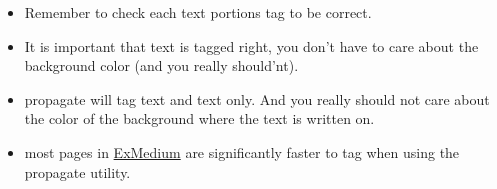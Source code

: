 \documentclass[12pt]{article}
\begin{document}
\begin{itemize}
\item Remember to check each text portions tag to be correct. \\
\item It is important that text is tagged right, you don't have to care about the background color (and you really should'nt). \\
\item propagate will tag text and text only. And you really should not care about the color of the background where the text is written on. \\
\item most pages in \hyperref{Examples - Medium}{Examples - Medium, page ~}{}{ExMedium} are significantly faster to tag when using the propagate utility. \\
\end{itemize}
\end{document}
